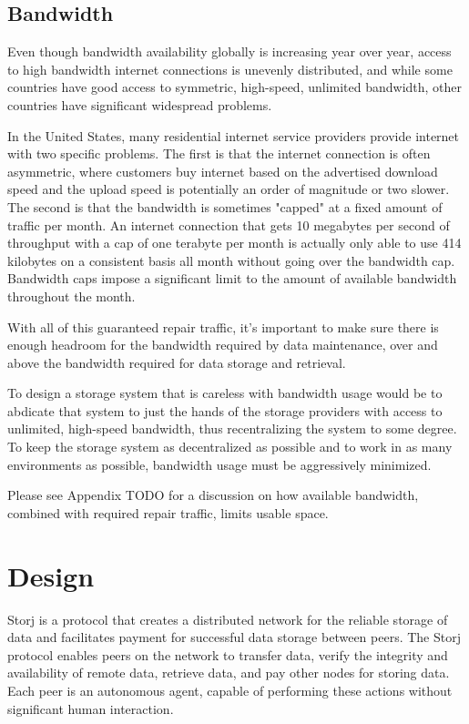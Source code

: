 \documentclass[a4paper,10pt]{article}
\newcommand{\todo}[1]{{\color{red} TODO #1}}
\begin{document}
\subsection{Bandwidth}

Even though bandwidth availability globally is increasing year over year, access
to high bandwidth internet connections is unevenly distributed, and while some
countries have good access to symmetric, high-speed, unlimited bandwidth, other
countries have significant widespread problems.

In the United States, many residential internet service providers provide
internet with two specific problems. The first is that the internet connection
is often asymmetric, where customers buy internet based on the advertised
download speed and the upload speed is potentially an order of magnitude or
two slower. The second is that the bandwidth is sometimes "capped" at a fixed
amount of traffic per month. An internet connection that gets 10 megabytes per
second of throughput with a cap of one terabyte per month is actually only able
to use 414 kilobytes on a consistent basis all month without going over the
bandwidth cap. Bandwidth caps impose a significant limit to the amount of
available bandwidth throughout the month.

With all of this guaranteed repair traffic, it's important to make sure there
is enough headroom for the bandwidth required by data maintenance, over and
above the bandwidth required for data storage and retrieval.

To design a storage system that is careless with bandwidth usage would be to
abdicate that system to just the hands of the storage providers with access to
unlimited, high-speed bandwidth, thus recentralizing the system to some degree.
To keep the storage system as decentralized as possible and to work in as many
environments as possible, bandwidth usage must be aggressively minimized.

Please see Appendix \todo{} for a discussion on how available bandwidth,
combined with required repair traffic, limits usable space.

\section{Design}

Storj is a protocol that creates a distributed network for the reliable storage
of data and facilitates payment for successful data storage between peers. The
Storj protocol enables peers on the network to transfer data, verify the
integrity and availability of remote data, retrieve data, and pay other nodes
for storing data.
Each peer is an autonomous agent, capable of performing these actions without
significant human interaction.
\end{document}
